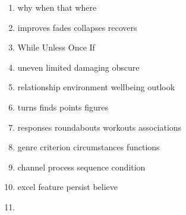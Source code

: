 \begin{enumerate}
	\item


\fourchoices
{why}
{when}
{that}
{where}




\item


\fourchoices
{improves}
{fades}
{collapses}
{recovers}




\item


\fourchoices
{While}
{Unless}
{Once}
{If}




\item


\fourchoices
{uneven}
{limited}
{damaging}
{obscure}




\item

\fourchoices
{relationship}
{environment}
{wellbeing}
{outlook}



\item


\fourchoices
{turns}
{finds}
{points}
{figures}




\item

\fourchoices
{responses}
{roundabouts}
{workouts}
{associations}



\item

\fourchoices
{genre}
{criterion}
{circumstances}
{functions}



\item


\fourchoices
{channel}
{process}
{sequence}
{condition}




\item


\fourchoices
{excel}
{feature}
{persist}
{believe}




\item



\end{enumerate}
